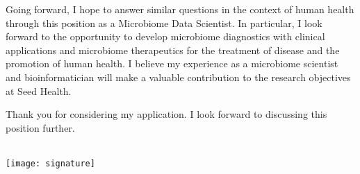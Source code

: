 \documentclass[11pt,letterpaper,sans]{moderncv}        %
\makeatletter
\renewcommand*{\makeletterclosing}{
  \@closing\\[3em]%
  \texttt{[image: signature]}\\%
  {\bfseries \@firstname~\@lastname}%
  \ifthenelse{\isundefined{\@enclosure}}{}{%
    \\%
    \vfill%
    {\color{color2}\itshape\enclname: \@enclosure}}}
\makeatother
\begin{document}
Going forward, I hope to answer similar questions in the context of human
health through this position as a Microbiome Data Scientist. In particular, I look
forward to the opportunity to develop microbiome diagnostics with clinical
applications and microbiome therapeutics for the treatment of disease and the
promotion of human health. I believe my experience as a microbiome scientist
and bioinformatician will make a valuable contribution to the research
objectives at Seed Health.

Thank you for considering my application. I look forward to discussing this
position further.


\makeletterclosing

\end{document}
